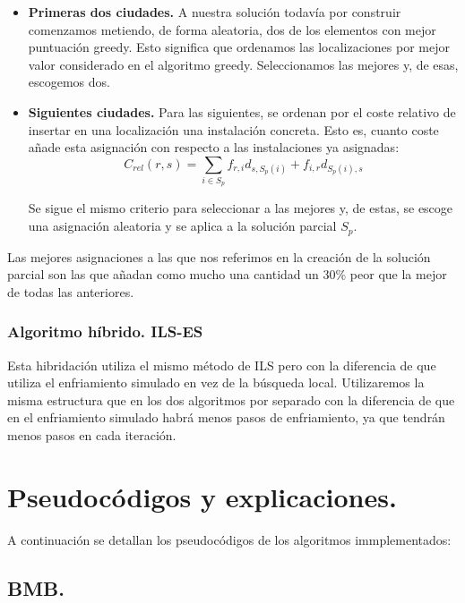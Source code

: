 \begin{itemize}
	\item \textbf{Primeras dos ciudades.} A nuestra solución todavía por construir comenzamos metiendo, de forma aleatoria, dos de los elementos con mejor puntuación greedy. Esto significa que ordenamos las localizaciones por mejor valor considerado en el algoritmo greedy. Seleccionamos las mejores y, de esas, escogemos dos.
	
	\item \textbf{Siguientes ciudades.} Para las siguientes, se ordenan por el coste relativo de insertar en una localización una instalación concreta. Esto es, cuanto coste añade esta asignación con respecto a las instalaciones ya asignadas:\\
	
	\[C_{rel}(r,s)=\sum_{i \in S_p}f_{r,i}d_{s,S_p(i)}+f_{i,r}d_{S_p(i),s} \]
	
	Se sigue el mismo criterio para seleccionar a las mejores y, de estas, se escoge una asignación aleatoria y se aplica a la solución parcial $S_p$.
\end{itemize}

Las mejores asignaciones a las que nos referimos en la creación de la solución parcial son las que añadan como mucho una cantidad un 30\% peor que la mejor de todas las anteriores. 



\subsubsection{Algoritmo híbrido. ILS-ES}

Esta hibridación utiliza el mismo método de ILS pero con la diferencia de que utiliza el enfriamiento simulado en vez de la búsqueda local. Utilizaremos la misma estructura que en los dos algoritmos por separado con la diferencia de que en el enfriamiento simulado habrá menos pasos de enfriamiento, ya que tendrán menos pasos en cada iteración.

\newpage
\section{Pseudocódigos y explicaciones.}

A continuación se detallan los pseudocódigos de los algoritmos immplementados:\\

\subsection{BMB.}

